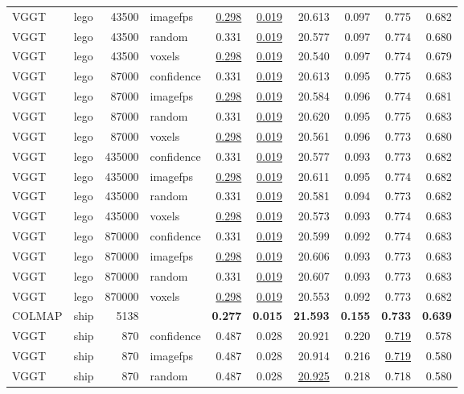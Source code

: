 \begin{table}[H]
\begin{tabular}{llrlrrrrrr}
VGGT & lego & 43500 & imagefps & \underline{0.298} & \underline{0.019} & 20.613 & 0.097 & 0.775 & 0.682 \\
VGGT & lego & 43500 & random & 0.331 & \underline{0.019} & 20.577 & 0.097 & 0.774 & 0.680 \\
VGGT & lego & 43500 & voxels & \underline{0.298} & \underline{0.019} & 20.540 & 0.097 & 0.774 & 0.679 \\
VGGT & lego & 87000 & confidence & 0.331 & \underline{0.019} & 20.613 & 0.095 & 0.775 & 0.683 \\
VGGT & lego & 87000 & imagefps & \underline{0.298} & \underline{0.019} & 20.584 & 0.096 & 0.774 & 0.681 \\
VGGT & lego & 87000 & random & 0.331 & \underline{0.019} & 20.620 & 0.095 & 0.775 & 0.683 \\
VGGT & lego & 87000 & voxels & \underline{0.298} & \underline{0.019} & 20.561 & 0.096 & 0.773 & 0.680 \\
VGGT & lego & 435000 & confidence & 0.331 & \underline{0.019} & 20.577 & 0.093 & 0.773 & 0.682 \\
VGGT & lego & 435000 & imagefps & \underline{0.298} & \underline{0.019} & 20.611 & 0.095 & 0.774 & 0.682 \\
VGGT & lego & 435000 & random & 0.331 & \underline{0.019} & 20.581 & 0.094 & 0.773 & 0.682 \\
VGGT & lego & 435000 & voxels & \underline{0.298} & \underline{0.019} & 20.573 & 0.093 & 0.774 & 0.683 \\
VGGT & lego & 870000 & confidence & 0.331 & \underline{0.019} & 20.599 & 0.092 & 0.774 & 0.683 \\
VGGT & lego & 870000 & imagefps & \underline{0.298} & \underline{0.019} & 20.606 & 0.093 & 0.773 & 0.683 \\
VGGT & lego & 870000 & random & 0.331 & \underline{0.019} & 20.607 & 0.093 & 0.773 & 0.683 \\
VGGT & lego & 870000 & voxels & \underline{0.298} & \underline{0.019} & 20.553 & 0.092 & 0.773 & 0.682 \\
\midrule
COLMAP & ship & 5138 &  & \textbf{0.277} & \textbf{0.015} & \textbf{21.593} & \textbf{0.155} & \textbf{0.733} & \textbf{0.639} \\
VGGT & ship & 870 & confidence & 0.487 & 0.028 & 20.921 & 0.220 & \underline{0.719} & 0.578 \\
VGGT & ship & 870 & imagefps & 0.487 & 0.028 & 20.914 & 0.216 & \underline{0.719} & 0.580 \\
VGGT & ship & 870 & random & 0.487 & 0.028 & \underline{20.925} & 0.218 & 0.718 & 0.580 \\

\end{tabular}
\end{table}
